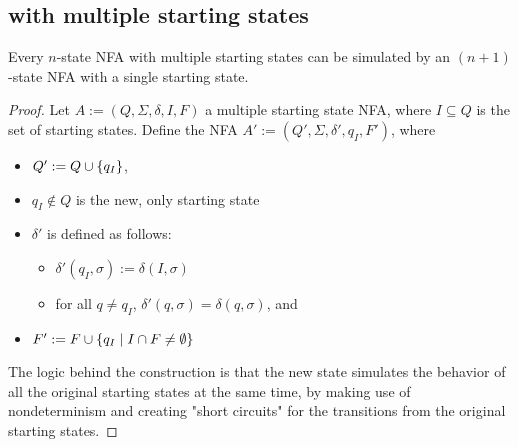 \subsection{\NFAs with multiple starting states}
\begin{thrm}\label{thm:mult-start-states}
	Every $n$-state NFA with multiple starting states can be simulated by an $(n+1)$-state NFA with a single starting state.
\end{thrm}
\begin{proof}
	Let $A:=(Q,\Sigma,\delta,I,F)$ a multiple starting state NFA, where $I\subseteq Q$ is the set of starting states.
	Define the NFA $A':=(Q',\Sigma,\delta',q_I,F')$, where
	\begin{itemize}
		\item $Q':=Q\cup\{q_I\}$,
		\item $q_I\notin Q$ is the new, only starting state
		\item $\delta'$ is defined as follows:
		      \begin{itemize}
			      \item $\delta'(q_I,\sigma):=\delta(I,\sigma)$
			      \item for all $q\ne q_I$, $\delta'(q,\sigma)=\delta(q,\sigma)$, and
		      \end{itemize}
		\item $F':=F\cup\{q_I\mid I\cap F\ne\emptyset\}$
	\end{itemize}
	The logic behind the construction is that the new state simulates the behavior of all the original starting states at the same time, by making use of nondeterminism and creating "short circuits" for the transitions from the original starting states.


\end{proof}
